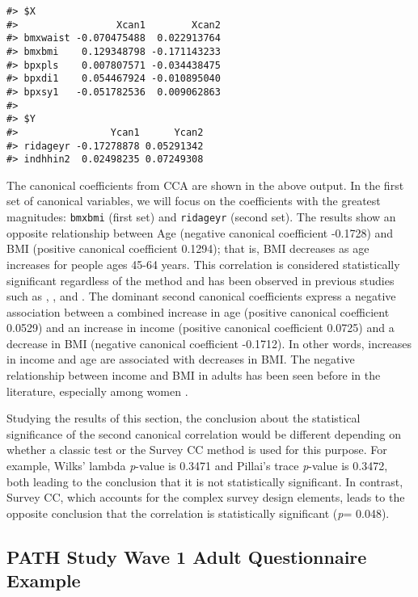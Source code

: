 \begin{verbatim}
#> $X
#>                 Xcan1        Xcan2
#> bmxwaist -0.070475488  0.022913764
#> bmxbmi    0.129348798 -0.171143233
#> bpxpls    0.007807571 -0.034438475
#> bpxdi1    0.054467924 -0.010895040
#> bpxsy1   -0.051782536  0.009062863
#> 
#> $Y
#>                Ycan1      Ycan2
#> ridageyr -0.17278878 0.05291342
#> indhhin2  0.02498235 0.07249308
\end{verbatim}

The canonical coefficients from CCA are shown in the above output. In the first set of canonical variables, we will focus on the coefficients with the greatest magnitudes: \texttt{bmxbmi} (first set) and \texttt{ridageyr} (second set). The results show an opposite relationship between Age (negative canonical coefficient -0.1728) and BMI (positive canonical coefficient 0.1294); that is, BMI decreases as age increases for people ages 45-64 years. This correlation is considered statistically significant regardless of the method and has been observed in previous studies such as \citep{yang2021}, \citep{amies2022}, \citep{sun2022} and \citep{jarrett2009}. The dominant second canonical coefficients express a negative association between a combined increase in age (positive canonical coefficient 0.0529) and an increase in income (positive canonical coefficient 0.0725) and a decrease in BMI (negative canonical coefficient -0.1712). In other words, increases in income and age are associated with decreases in BMI. The negative relationship between income and BMI in adults has been seen before in the literature, especially among women \citep{garcia2009}.

Studying the results of this section, the conclusion about the statistical significance of the second canonical correlation would be different depending on whether a classic test or the Survey CC method is used for this purpose. For example, Wilks' lambda \emph{p}-value is 0.3471 and Pillai's trace \emph{p}-value is 0.3472, both leading to the conclusion that it is not statistically significant. In contrast, Survey CC, which accounts for the complex survey design elements, leads to the opposite conclusion that the correlation is statistically significant (\emph{p}= 0.048).

\hypertarget{path-study-wave-1-adult-questionnaire-example}{%
\subsection{PATH Study Wave 1 Adult Questionnaire Example}\label{path-study-wave-1-adult-questionnaire-example}}

